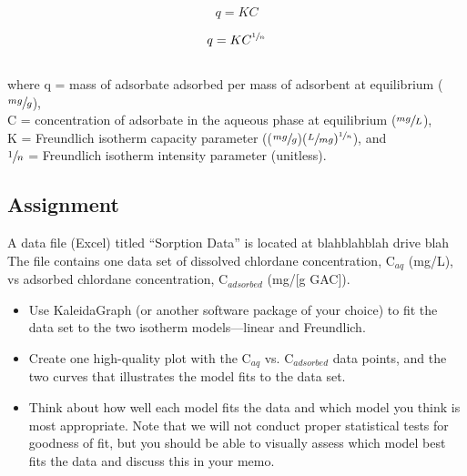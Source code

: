 \documentclass[12pt,letterpaper]{article}
\begin{document}
\begin{equation}
q = KC
\end{equation}


\begin{equation}
q = KC^{\sfrac{1}{n}}
\end{equation}\\

where q = mass of adsorbate adsorbed per mass of adsorbent at equilibrium ($\sfrac{mg}{g}$),\\

C = concentration of adsorbate in the aqueous phase at equilibrium ($\sfrac{mg}{L}$),\\

K = Freundlich isotherm capacity parameter (($\sfrac{mg}{g}$)($\sfrac{L}{mg})^{\sfrac{1}{n}}$), and\\

$\sfrac{1}{n}$ = Freundlich isotherm intensity parameter (unitless).\\


\subsection *{Assignment}

A data file (Excel) titled ``Sorption Data'' is located at blahblahblah drive blah
The file contains one data set of dissolved chlordane concentration, C$_{aq}$ (mg/L), vs adsorbed chlordane concentration, C$_{adsorbed}$ (mg/[g GAC]).

\begin{itemize} 
\item Use KaleidaGraph (or another software package of your choice) to fit the data set to  the two isotherm models---linear and Freundlich.
\item Create one high-quality plot with the C$_{aq}$ vs. C$_{adsorbed}$ data points, and the two curves that illustrates the model fits to the data set. 
\item Think about how well each model fits the data and which model you think is most  appropriate. Note that we will not conduct proper statistical tests for goodness of fit, but you should be able to visually assess which model best fits the data and discuss this in your memo.
 
\end{itemize}
\end{document}
